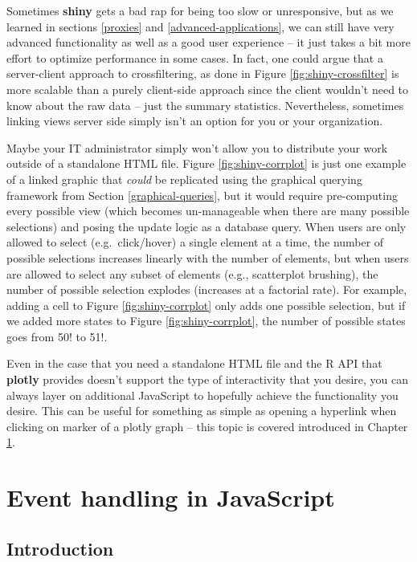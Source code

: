 \documentclass[
  12pt,
]{krantz}
\begin{document}
Sometimes \textbf{shiny} gets a bad rap for being too slow or unresponsive, but as we learned in sections \ref{proxies} and \ref{advanced-applications}, we can still have very advanced functionality as well as a good user experience -- it just takes a bit more effort to optimize performance in some cases. In fact, one could argue that a server-client approach to crossfiltering, as done in Figure \ref{fig:shiny-crossfilter} is more scalable than a purely client-side approach since the client wouldn't need to know about the raw data -- just the summary statistics. Nevertheless, sometimes linking views server side simply isn't an option for you or your organization.

Maybe your IT administrator simply won't allow you to distribute your work outside of a standalone HTML file. Figure \ref{fig:shiny-corrplot} is just one example of a linked graphic that \emph{could} be replicated using the graphical querying framework from Section \ref{graphical-queries}, but it would require pre-computing every possible view (which becomes un-manageable when there are many possible selections) and posing the update logic as a database query. When users are only allowed to select (e.g.~click/hover) a single element at a time, the number of possible selections increases linearly with the number of elements, but when users are allowed to select any subset of elements (e.g., scatterplot brushing), the number of possible selection explodes (increases at a factorial rate). For example, adding a cell to Figure \ref{fig:shiny-corrplot} only adds one possible selection, but if we added more states to Figure \ref{fig:shiny-corrplot}, the number of possible states goes from 50! to 51!.

Even in the case that you need a standalone HTML file and the R API that \textbf{plotly} provides doesn't support the type of interactivity that you desire, you can always layer on additional JavaScript to hopefully achieve the functionality you desire. This can be useful for something as simple as opening a hyperlink when clicking on marker of a plotly graph -- this topic is covered introduced in Chapter \ref{javascript}.

\hypertarget{part-event-handling-in-javascript}{%
\part{Event handling in JavaScript}\label{part-event-handling-in-javascript}}

\hypertarget{javascript}{%
\chapter{Introduction}\label{javascript}}
\end{document}
